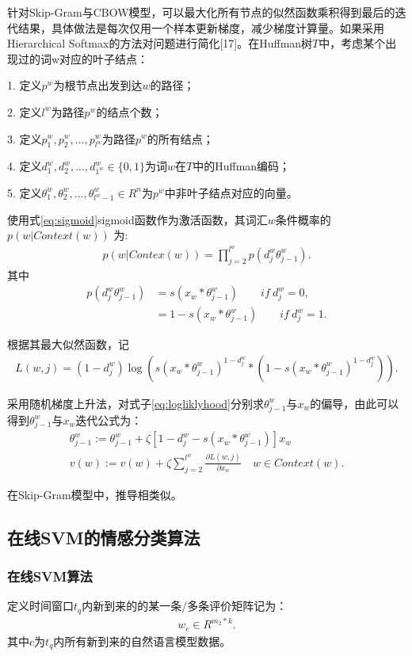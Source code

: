 \documentclass[UTF8]{csoarticle}
\begin{document}
针对Skip-Gram与CBOW模型，可以最大化所有节点的似然函数乘积得到最后的迭代结果，具体做法是每次仅用一个样本更新梯度，减少梯度计算量。如果采用Hierarchical Softmax的方法对问题进行简化[17]。在Huffman树$T$中，考虑某个出现过的词w对应的叶子结点：

1. 定义$p^w$为根节点出发到达$w$的路径；

2. 定义$l^w$为路径$p^w$的结点个数；

3. 定义$p_1^w,p_2^w,...,p_{l^w}^w$为路径$p^w$的所有结点；

4. 定义$d_1^w, d_2^w,...,d_{1^w}^w\in\{0,1\}$为词$w$在$T$中的Huffman编码；

5. 定义$\theta_1^w,\theta_2^w,...,\theta_{l^w-1}^w \in R^n$为$p^w$中非叶子结点对应的向量。

使用式\eqref{eq:sigmoid}sigmoid函数作为激活函数，其词汇$w$条件概率的$p(w|Context(w))$ 为:
\begin{align}\label{eq:wconditions}
p(w|Contex(w))=\prod_{j=2}^{l^w}{p(d_j^w \theta_{j-1}^w)} .
\end{align}
其中
\begin{align}\label{eq:wcondition}
p(d_j^w \theta_{j-1}^w  ) &=s(x_w*\theta_{j-1}^w )\qquad if\ d_j^w=0,\\
&=1-s(x_w*θ_{j-1}^w )\qquad if\ d_j^w=1.
\end{align}

根据其最大似然函数，记
\begin{align}\label{eq:logliklyhood}
L(w,j)=(1-d_j^w )\log{( s(x_w*\theta_{j-1}^w )^{1-d_j^w}*(1-s(x_w*\theta_{j-1}^w )^{1-d_j^w }))}.
\end{align}

采用随机梯度上升法，对式子\eqref{eq:logliklyhood}分别求$\theta_{j-1}^w$与$x_w$的偏导，由此可以得到$\theta_{j-1}^w$与$x_w$迭代公式为：
\begin{align}\label{eq:iteration}
\theta_{j-1}^w :=\theta_{j-1}^w+\zeta[1-d_j^w-s(x_w*\theta_{j-1}^w )]x_w\\
v(w):=v(w)+\zeta\sum_{j=2}^{l^w}{\frac{\partial{L(w,j)}}{\partial{x_w}}}\quad w\in Context(w).
\end{align}

在Skip-Gram模型中，推导相类似。

\subsection{在线SVM的情感分类算法}
\subsubsection{在线SVM算法}
定义时间窗口$t_q$内新到来的的某一条/多条评价矩阵记为：
\begin{align}\label{eq:tqSentiMatrix}
w_c\in R^{m_2*k}.
\end{align}
其中${c}$为$t_q$内所有新到来的自然语言模型数据。
\end{document}
